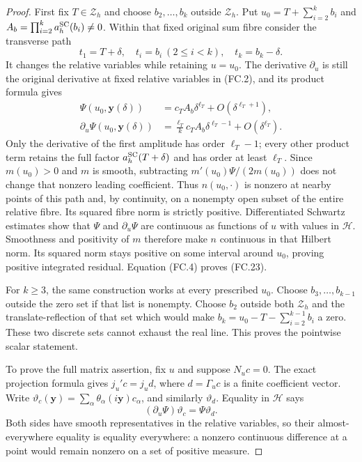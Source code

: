 \begin{proof}
First fix \(T\in\mathcal Z_h\) and choose
\(b_2,\ldots,b_k\) outside \(\mathcal Z_h\). Put
\(u_0=T+\sum_{i=2}^kb_i\) and
\(A_b=\prod_{i=2}^ka_h^{\rm SC}(b_i)\ne0\).
Within that fixed original sum fibre consider the transverse path
\[
 t_1=T+\delta,\quad t_i=b_i\ (2\le i<k),\quad
 t_k=b_k-\delta.
\]
It changes the relative variables while retaining \(u=u_0\).
The derivative \(\partial_u\) is still the original derivative
at fixed relative variables in (FC.2), and its product formula gives
\[
 \begin{aligned}
  \Psi(u_0,\mathbf y(\delta))
      &=c_TA_b\delta^{\ell_T}+O(\delta^{\ell_T+1}),\\
  \partial_u\Psi(u_0,\mathbf y(\delta))
      &=\frac{\ell_T}{k}c_TA_b\delta^{\ell_T-1}
                              +O(\delta^{\ell_T}).
 \end{aligned}
 \tag{FC.25}
\]
Only the derivative of the first amplitude has order
\(\ell_T-1\); every other product term retains the full
factor \(a_h^{\rm SC}(T+\delta)\) and has order at least
\(\ell_T\). Since \(m(u_0)>0\) and \(m\) is smooth,
subtracting \(m'(u_0)\Psi/(2m(u_0))\) does not change that
nonzero leading coefficient. Thus \(n(u_0,\cdot)\) is nonzero
at nearby points of this path and, by continuity, on a nonempty
open subset of the entire relative fibre. Its squared fibre norm
is strictly positive. Differentiated Schwartz estimates show that
\(\Psi\) and \(\partial_u\Psi\) are continuous as functions
of \(u\) with values in \(\mathscr H\). Smoothness and positivity
of \(m\) therefore make \(n\) continuous in that Hilbert norm.
Its squared norm stays positive on some interval around \(u_0\),
proving positive integrated residual. Equation (FC.4) proves (FC.23).

For \(k\ge3\), the same construction works at every prescribed
\(u_0\). Choose \(b_3,\ldots,b_{k-1}\) outside the zero set
if that list is nonempty. Choose \(b_2\) outside both
\(\mathcal Z_h\) and the translate-reflection of that set which
would make
\(b_k=u_0-T-\sum_{i=2}^{k-1}b_i\) a zero.
These two discrete sets cannot exhaust the real line. This proves
the pointwise scalar statement.

To prove the full matrix assertion, fix \(u\) and suppose
\(N_uc=0\). The exact projection formula gives
\(j_u'c=j_ud\), where \(d=\Gamma_uc\) is a finite coefficient
vector. Write \(\vartheta_c(\mathbf y)=
\sum_\alpha\theta_\alpha(i\mathbf y)c_\alpha\), and similarly
\(\vartheta_d\). Equality in \(\mathscr H\) says
\[
 (\partial_u\Psi)\vartheta_c=\Psi\vartheta_d.
\]
Both sides have smooth representatives in the relative variables,
so their almost-everywhere equality is equality everywhere: a nonzero
continuous difference at a point would remain nonzero on a set of
positive measure.


\end{proof}
